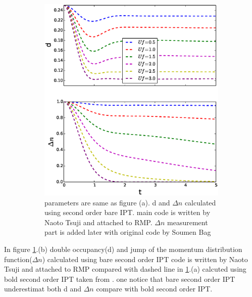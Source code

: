 \begin{figure}[H]
\begin{subfigure}{.5\textwidth}
  \includegraphics[width=1.\linewidth]{bench_marking/dn_d.eps}
  \caption{parameters are same as figure (a). d and $\Delta n$ calculated using second order bare IPT. main code is written by Naoto Tsuji and attached to RMP\cite{RMP}. $\Delta n$ measurement part is added later with original code by Soumen Bag   }
\end{subfigure}
\caption{}
\label{d_dn}
\end{figure}

In figure \ref{d_dn}.(b) double occupancy(d) and jump of the momentum distribution function($\Delta n$) calculated using bare second order IPT code is written by Naoto Tsuji and attached to RMP\cite{RMP} compared with dashed line in \ref{d_dn}.(a) calcuted using bold second order IPT taken from \cite{HUB}. one notice that bare second order IPT underestimat both d and $\Delta n$ compare with bold second order IPT.


